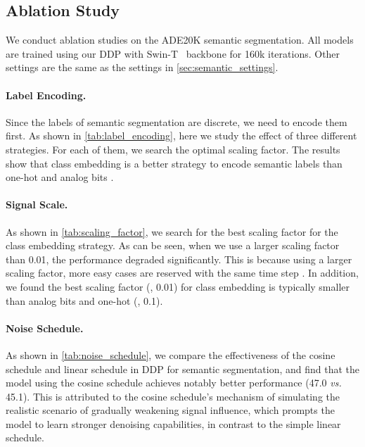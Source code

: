 \documentclass[10pt,twocolumn,letterpaper]{article}
\newcommand{\ours}[0]{DDP\xspace}
\begin{document}
\subsection{Ablation Study}
We conduct ablation studies on the ADE20K semantic segmentation.
All models are trained using our \ours with Swin-T~\cite{liu2021swin} backbone for 160k iterations.
Other settings are the same as the settings in \cref{sec:semantic_settings}.
\label{sec:exp:abla}

\paragraph{Label Encoding.}
Since the labels of semantic segmentation are discrete, we need to encode them first. As shown in \cref{tab:label_encoding}, here we study the effect of three different strategies. For each of them, we search the optimal scaling factor. The results show that class embedding is a better strategy to encode semantic labels than one-hot and analog bits \cite{chen2022generalist}.

\paragraph{Signal Scale.}
As shown in \cref{tab:scaling_factor}, we search for the best scaling factor for the class embedding strategy. As can be seen, when we use a larger scaling factor than 0.01, the performance degraded significantly. This is because using a larger scaling factor, more easy cases are reserved with the same time step .
In addition, we found the best scaling factor (\ie, 0.01) for class embedding is typically smaller than analog bits \cite{chen2022generalist} and one-hot (\ie, 0.1). 

\paragraph{Noise Schedule.} 
As shown in \cref{tab:noise_schedule}, we compare the effectiveness of the cosine schedule \cite{nichol2021improved} and linear schedule \cite{ho2020denoising} in \ours for semantic segmentation, and find that the model using the cosine schedule achieves notably better performance (47.0 \emph{vs.} 45.1).
This is attributed to the cosine schedule's mechanism of simulating the realistic scenario of gradually weakening signal influence, which prompts the model to learn stronger denoising capabilities, in contrast to the simple linear schedule. 
\end{document}
